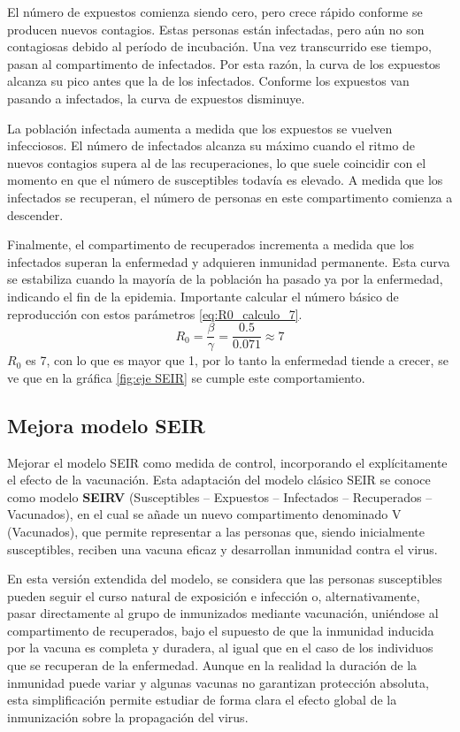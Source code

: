 El número de expuestos comienza siendo cero, pero crece rápido conforme se producen nuevos contagios. Estas personas están infectadas, pero aún no son contagiosas debido al período de incubación. Una vez transcurrido ese tiempo, pasan al compartimento de infectados. Por esta razón, la curva de los expuestos alcanza su pico antes que la de los infectados. Conforme los expuestos van pasando a infectados, la curva de expuestos disminuye.

La población infectada aumenta a medida que los expuestos se vuelven infecciosos. El número de infectados alcanza su máximo cuando el ritmo de nuevos contagios supera al de las recuperaciones, lo que suele coincidir con el momento en que el número de susceptibles todavía es elevado. A medida que los infectados se recuperan, el número de personas en este compartimento comienza a descender.

Finalmente, el compartimento de recuperados incrementa a medida que los infectados superan la enfermedad y adquieren inmunidad permanente. Esta curva se estabiliza cuando la mayoría de la población ha pasado ya por la enfermedad, indicando el fin de la epidemia.
Importante calcular el número básico de reproducción con estos parámetros \eqref{eq:R0_calculo_7}.
\begin{equation}
R_0 = \frac{\beta}{\gamma} = \frac{0.5}{0.071} \approx 7
\label{eq:R0_calculo_7}
\end{equation}
$R_0$ es 7, con lo que es mayor que 1, por lo tanto la enfermedad tiende a crecer, se ve que en la gráfica \ref{fig:eje SEIR} se cumple este comportamiento.

\subsection{Mejora modelo SEIR}
Mejorar el modelo SEIR como medida de control, incorporando el explícitamente el efecto de la vacunación. Esta adaptación del modelo clásico SEIR se conoce como modelo \textbf{SEIRV} (Susceptibles – Expuestos – Infectados – Recuperados – Vacunados), en el cual se añade un nuevo compartimento denominado V (Vacunados), que permite representar a las personas que, siendo inicialmente susceptibles, reciben una vacuna eficaz y desarrollan inmunidad contra el virus.

En esta versión extendida del modelo, se considera que las personas susceptibles pueden seguir el curso natural de exposición e infección o, alternativamente, pasar directamente al grupo de inmunizados mediante vacunación, uniéndose al compartimento de recuperados, bajo el supuesto de que la inmunidad inducida por la vacuna es completa y duradera, al igual que en el caso de los individuos que se recuperan de la enfermedad. Aunque en la realidad la duración de la inmunidad puede variar y algunas vacunas no garantizan protección absoluta, esta simplificación permite estudiar de forma clara el efecto global de la inmunización sobre la propagación del virus.

